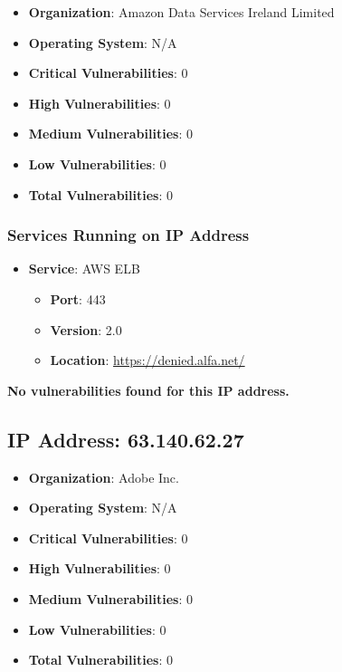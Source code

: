 \documentclass{article}
\begin{document}
\begin{itemize}
    \item \textbf{Organization}: Amazon Data Services Ireland Limited
    \item \textbf{Operating System}:  N/A 
    \item \textbf{Critical Vulnerabilities}: 0
    \item \textbf{High Vulnerabilities}: 0
    \item \textbf{Medium Vulnerabilities}: 0
    \item \textbf{Low Vulnerabilities}: 0
    \item \textbf{Total Vulnerabilities}: 0
\end{itemize}

\subsubsection*{Services Running on IP Address}

\begin{itemize}
    
        \item \textbf{Service}: AWS ELB
        \begin{itemize}
            \item \textbf{Port}: 443
            \item \textbf{Version}:  2.0 
            \item \textbf{Location}: \href{ https://denied.alfa.net/ }{ https://denied.alfa.net/ }
        \end{itemize}
    
\end{itemize}


\textbf{No vulnerabilities found for this IP address.}




\clearpage



\subsection{IP Address: 63.140.62.27}

\begin{itemize}
    \item \textbf{Organization}: Adobe Inc.
    \item \textbf{Operating System}:  N/A 
    \item \textbf{Critical Vulnerabilities}: 0
    \item \textbf{High Vulnerabilities}: 0
    \item \textbf{Medium Vulnerabilities}: 0
    \item \textbf{Low Vulnerabilities}: 0
    \item \textbf{Total Vulnerabilities}: 0
\end{itemize}
\end{document}
